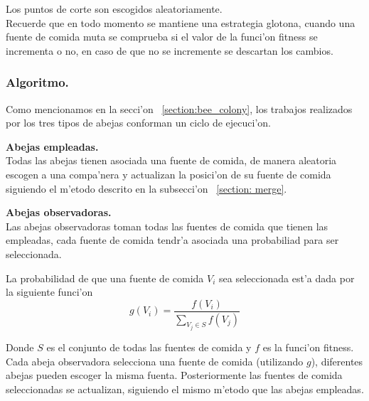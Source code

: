 \documentclass[12pt]{article}
\begin{document}
    Los puntos de corte son escogidos aleatoriamente.\\
    Recuerde que en todo momento se mantiene una estrategia glotona, cuando una fuente de comida muta se comprueba
    si el valor de la funci'on fitness se incrementa o no, en caso de que no se incremente se descartan los cambios.


    \subsubsection{Algoritmo.}
    Como mencionamos en la secci'on ~\ref{section:bee_colony}, los trabajos realizados por los tres tipos de abejas
    conforman un ciclo de ejecuci'on.

    \textbf{Abejas empleadas.}\\
    Todas las abejas tienen asociada una fuente de comida, de manera aleatoria escogen a una compa'nera y
    actualizan la posici'on de su fuente de comida siguiendo el m'etodo descrito en la subsecci'on ~\ref{section: merge}.

    \textbf{Abejas observadoras.}\\
    Las abejas observadoras toman todas las fuentes de comida que tienen las empleadas, cada fuente
    de comida tendr'a asociada una probabiliad para ser seleccionada.

    La probabilidad de que una fuente de comida $V_i$ sea seleccionada est'a dada por la
    siguiente funci'on
    \begin{equation}\label{eq: selection_function}
        g( V_i ) =  \dfrac{ f(V_i ) } { \displaystyle \sum_{ V_j \in S } f(V_j) }
    \end{equation}

    Donde $S$ es el conjunto de todas las fuentes de comida y $f$ es la funci'on fitness. \\
    Cada abeja observadora selecciona una fuente de comida (utilizando $g$), diferentes abejas pueden escoger la misma
    fuenta. Posteriormente las fuentes de comida seleccionadas se actualizan, siguiendo el mismo m'etodo
    que las abejas empleadas.
\end{document}
